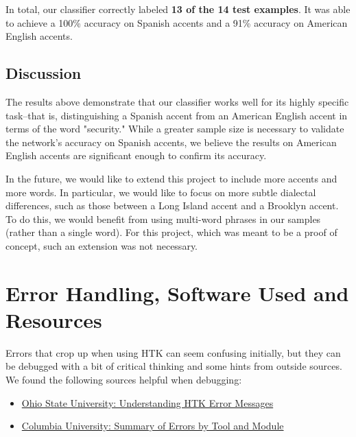 \documentclass{wileySev}
\begin{document}
In total, our classifier correctly labeled \textbf{13 of the 14 test examples}. It was able to achieve a 100\% accuracy on Spanish accents and a 91\% accuracy on American English accents.
\chapter{Discussion}
The results above demonstrate that our classifier works well for its highly specific task--that is, distinguishing a Spanish accent from an American English accent in terms of the word "security." While a greater sample size is necessary to validate the network's accuracy on Spanish accents, we believe the results on American English accents are significant enough to confirm its accuracy.

In the future, we would like to extend this project to include more accents and more words. In particular, we would like to focus on more subtle dialectal differences, such as those between a Long Island accent and a Brooklyn accent. To do this, we would benefit from using multi-word phrases in our samples (rather than a single word). For this project, which was meant to be a proof of concept, such an extension was not necessary.
\part{Error Handling, Software Used and Resources}

Errors that crop up when using HTK can seem confusing initially, but they can be debugged with a bit of critical thinking and some hints from outside sources. We found the following sources helpful when debugging:
\begin{itemize}
\item \href{http://www.ling.ohio-state.edu/~bromberg/htk_problems.html}{Ohio State University: Understanding HTK Error Messages}
\item \href{http://www.ee.columbia.edu/~dpwe/LabROSA/doc/HTKBook21/node256.html}{Columbia University: Summary of Errors by Tool and Module}
\end{itemize}
\end{document}
